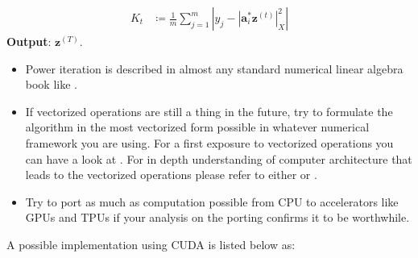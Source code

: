 {\begin{algorithm}[!htbp]
\begin{equation*}
\begin{split}
        K_t             &\coloneqq \frac{1}{m}\sum_{j=1}^{m}\left|y_j-\left|\boldsymbol{a}_i^*\boldsymbol{z}^{(t)}\right|_X^2\right|
      \end{split}
    \end{equation*}
    \textbf{Output}: $\boldsymbol{z}^{(T)}$.
  \end{algorithm}
  \begin{itemize}
    \item Power iteration is described in almost any standard numerical linear algebra book like \cite{Trefethen2022}\cite{Demmel1997}\cite{Golub2013}. 
    \item If vectorized operations are still a thing in the future, try to formulate the algorithm in the most vectorized form possible in whatever 
    numerical framework you are using. For a first exposure to vectorized operations you can have a look at \cite{Hager2010}. For in depth understanding of 
    computer architecture that leads to the vectorized operations please refer to either \cite{Patterson2014} or \cite{Hennessy2019}.
    \item Try to port as much as computation possible from \ac{CPU} to accelerators like \ac{GPU}s and \ac{TPU}s if 
    your analysis on the porting confirms it to be worthwhile.
  \end{itemize}
  A possible \pytorch\cite{LFMAI2023} implementation using \ac{CUDA}\cite{Nvidia} is listed below as:
\clearpage %
}

